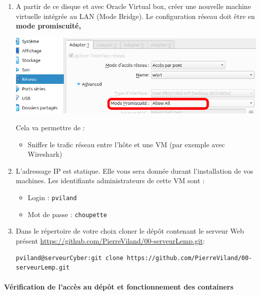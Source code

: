 \documentclass[french, 12pt]{article}%
\newcommand{\itemE}{\item[$\bullet$]}
\begin{document}
\begin{enumerate}
\item A partir de ce disque et avec Oracle Virtual box, créer une nouvelle machine virtuelle intégrée au LAN (Mode Bridge). Le configuration réseau doit être en \textbf{mode promiscuité,}

\begin{center}
\includegraphics[scale=0.4]{./ressource/modeProm.png}
\end{center}
Cela va permettre de : 
	\begin{itemize}
	\itemE Sniffer le trafic réseau entre l'hôte et une VM (par exemple avec Wireshark)
	\end{itemize}

\item L'adressage IP est statique. Elle vous sera donnée durant l'installation de vos machines. Les identifiants administrateurs de cette VM sont : 
	\begin{itemize}
	\itemE Login : \verb?pviland?
	\itemE Mot de passe : \verb?choupette?
	\end{itemize}
\item Dans le répertoire de votre choix cloner le dépôt contenant le serveur Web présent \href{https://github.com/PierreViland/00-serveurLemp.git}{https://github.com/PierreViland/00-serveurLemp.git}: 

	\begin{lstlisting}[style=commande]
pviland@serveurCyber:git clone https://github.com/PierreViland/00-serveurLemp.git
\end{lstlisting}
	
\end{enumerate}


\paragraph{Vérification de l'accès au dépôt et fonctionnement des containers}
\end{document}
